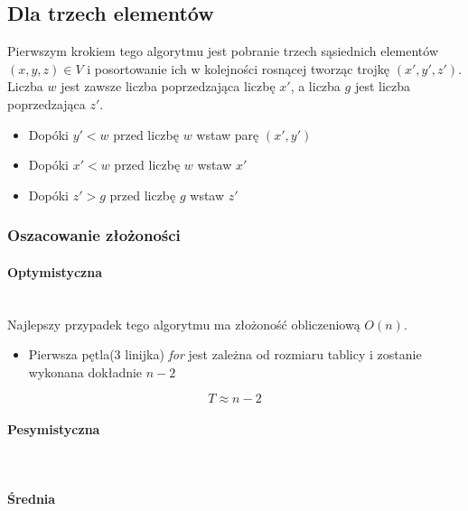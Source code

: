 \subsection{Dla trzech elementów}
Pierwszym krokiem tego algorytmu jest pobranie trzech sąsiednich elementów $(x,y,z) \in V$ i posortowanie ich w kolejności rosnącej tworząc trojkę $(x',y',z')$. Liczba $w$ jest zawsze liczba poprzedzająca liczbę $x'$, a liczba $g$ jest liczba poprzedzająca $z'$.
\begin{itemize}
\item Dopóki $y'<w$ przed liczbę $w$ wstaw parę $(x',y')$
\item Dopóki $x'<w$ przed liczbę $w$ wstaw $x'$
\item Dopóki $z'>g$ przed liczbę $g$ wstaw $z'$
\end{itemize}
\subsubsection{Oszacowanie złożoności}
\paragraph{Optymistyczna}\mbox{}\\
Najlepszy przypadek tego algorytmu ma złożoność obliczeniową $O(n)$. 
\begin{itemize}
\item Pierwsza pętla(3 linijka) \textit{for} jest zależna od rozmiaru tablicy i zostanie wykonana dokładnie $n-2$
\end{itemize}

\begin{equation*}
T \approx n - 2
\end{equation*}
\wyjT
\paragraph{Pesymistyczna}\mbox{}\\
\paragraph{Średnia}\mbox{}\\

